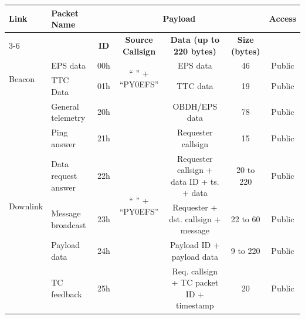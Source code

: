 \begin{landscape}
    \begin{table}[!ht]
        \centering
        \small
        \begin{tabular}{llccccc}
            \toprule[1.5pt]
            \multirow{2}{*}{\textbf{Link}} & \multirow{2}{*}{\textbf{Packet Name}} & \multicolumn{4}{c}{\textbf{Payload}} & \multirow{2}{*}{\textbf{Access}} \\
            \cmidrule{3-6}
                                      &                       & \textbf{\acs{ID}}  & \textbf{Source Callsign}   & \textbf{Data (up to 220 bytes)}                & \textbf{Size (bytes)} & \\
            \midrule
            \multirow{2}{*}{Beacon}   & \ac{EPS} data              & 00h & \multirow{2}{*}{`` '' + ``PY0EFS''} & \ac{EPS} data                                       & 46                    & Public \\
                                      & \ac{TTC} Data              & 01h &                                     & \ac{TTC} data                                       & 19                    & Public \\
            \midrule
            \multirow{7}{*}{Downlink} & General telemetry     & 20h & \multirow{7}{*}{`` '' + ``PY0EFS''} & \ac{OBDH}/\ac{EPS} data                                  & 78                    & Public \\
                                      & Ping answer           & 21h &                                     & Requester callsign                             & 15                    & Public \\
                                      & Data request answer   & 22h &                                     & Requester callsign + data \acs{ID} + ts. + data      & 20 to 220             & Public \\
                                      & Message broadcast     & 23h &                                     & Requester + dst. callsign + message            & 22 to 60              & Public \\
                                      & Payload data          & 24h &                                     & Payload \acs{ID} + payload data                      & 9 to 220              & Public \\
                                      & TC feedback           & 25h &                                     & Req. callsign + TC packet \acs{ID} + timestamp       & 20                    & Public \\

\end{tabular}
\end{table}
\end{landscape}
